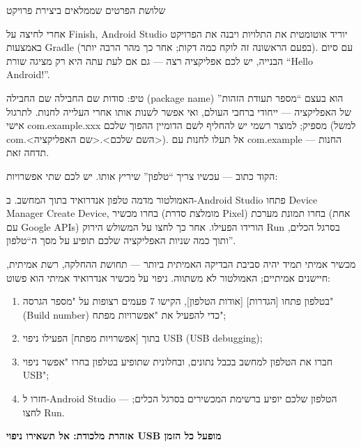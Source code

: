 \begin{center}\small\color{gray}שלושת הפרטים שממלאים ביצירת פרויקט\end{center}

אחרי לחיצה על Finish, Android Studio יוריד אוטומטית את התלויות ויבנה את הפרויקט באמצעות Gradle (בפעם הראשונה זה לוקח כמה דקות; אחר כך מהר הרבה יותר). עם סיום הבנייה, יש לכם אפליקציה רצה — גם אם לעת עתה היא רק מציגה שורת “Hello Android!”.

\begin{tcbinfo}{טיפ: סודות שם החבילה}
שם החבילה (package name) הוא בעצם “מספר תעודת הזהות” של האפליקציה — ייחודי ברחבי העולם, ואי אפשר לשנות אותו אחרי העלייה לחנות. לתרגול אישי com.example.xxx מספיק; למוצר רשמי יש להחליף לשם הדומיין ההפוך שלכם (למשל com.<השם שלכם>.<שם האפליקציה>). אל תעלו לחנות עם com.example — החנות תדחה זאת.

\end{tcbinfo}


הקוד כתוב — עכשיו צריך “טלפון” שיריץ אותו. יש לכם שתי אפשרויות:


האמולטור מדמה טלפון אנדרואיד בתוך המחשב. ב-Android Studio פתחו Device Manager Create Device, בחרו מכשיר (מומלצת סדרת Pixel) בחרו תמונת מערכת (אחת עם Google APIs) הורידו הפעילו. אחר כך לחצו על המשולש הירוק Run בסרגל הכלים, ותוך כמה שניות האפליקציה שלכם תופיע על מסך ה“טלפון”.


מכשיר אמיתי תמיד יהיה סביבת הבדיקה האמיתית ביותר — תחושת ההחלקה, רשת אמיתית, חיישנים אמיתיים; האמולטור לא משתווה. ניפוי על מכשיר אנדרואיד אמיתי הוא פשוט:

\begin{enumerate}
  \item בטלפון פתחו [הגדרות] [אודות הטלפון], הקישו 7 פעמים רצופות על "מספר הגרסה" (Build number) כדי להפעיל את "אפשרויות מפתח";
  \item בתוך [אפשרויות מפתח] הפעילו ניפוי USB (USB debugging);
  \item חברו את הטלפון למחשב בכבל נתונים, ובחלונית שתופיע בטלפון בחרו "אפשר ניפוי USB";
  \item חזרו ל-Android Studio — הטלפון שלכם יופיע ברשימת המכשירים בסרגל הכלים; לחצו Run.
\end{enumerate}

\textbf{אזהרת מלכודת: אל תשאירו ניפוי USB מופעל כל הזמן}\par

